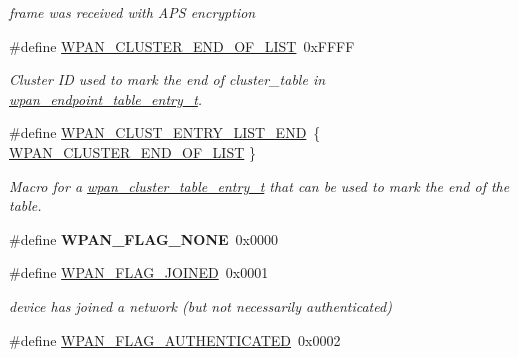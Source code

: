 \begin{DoxyCompactItemize}
\begin{DoxyCompactList}\small\item\em frame was received with A\+PS encryption \end{DoxyCompactList}\item 
\#define \hyperlink{group__wpan__aps_gacbfdff1cef70167f178c4e05b69f65fe}{W\+P\+A\+N\+\_\+\+C\+L\+U\+S\+T\+E\+R\+\_\+\+E\+N\+D\+\_\+\+O\+F\+\_\+\+L\+I\+ST}~0x\+F\+F\+FF
\begin{DoxyCompactList}\small\item\em Cluster ID used to mark the end of {\ttfamily cluster\+\_\+table} in \hyperlink{structwpan__endpoint__table__entry__t}{wpan\+\_\+endpoint\+\_\+table\+\_\+entry\+\_\+t}. \end{DoxyCompactList}\item 
\#define \hyperlink{group__wpan__aps_ga55a7fbd8adf019d268f17b6ede90fe0f}{W\+P\+A\+N\+\_\+\+C\+L\+U\+S\+T\+\_\+\+E\+N\+T\+R\+Y\+\_\+\+L\+I\+S\+T\+\_\+\+E\+ND}~\{ \hyperlink{group__wpan__aps_gacbfdff1cef70167f178c4e05b69f65fe}{W\+P\+A\+N\+\_\+\+C\+L\+U\+S\+T\+E\+R\+\_\+\+E\+N\+D\+\_\+\+O\+F\+\_\+\+L\+I\+ST} \}
\begin{DoxyCompactList}\small\item\em Macro for a \hyperlink{structwpan__cluster__table__entry__t}{wpan\+\_\+cluster\+\_\+table\+\_\+entry\+\_\+t} that can be used to mark the end of the table. \end{DoxyCompactList}\item 
\mbox{\label{group__wpan__aps_ga550a679be9209ba69cdc3d6a0846b86d}} 
\#define {\bfseries W\+P\+A\+N\+\_\+\+F\+L\+A\+G\+\_\+\+N\+O\+NE}~0x0000
\item 
\mbox{\label{group__wpan__aps_gaa06c0d38b4a130f9657abf26c73b49dd}} 
\#define \hyperlink{group__wpan__aps_gaa06c0d38b4a130f9657abf26c73b49dd}{W\+P\+A\+N\+\_\+\+F\+L\+A\+G\+\_\+\+J\+O\+I\+N\+ED}~0x0001
\begin{DoxyCompactList}\small\item\em device has joined a network (but not necessarily authenticated) \end{DoxyCompactList}\item 
\mbox{\label{group__wpan__aps_ga6508b417838fc0a043f5570b65e3f24b}} 
\#define \hyperlink{group__wpan__aps_ga6508b417838fc0a043f5570b65e3f24b}{W\+P\+A\+N\+\_\+\+F\+L\+A\+G\+\_\+\+A\+U\+T\+H\+E\+N\+T\+I\+C\+A\+T\+ED}~0x0002

\end{DoxyCompactItemize}
